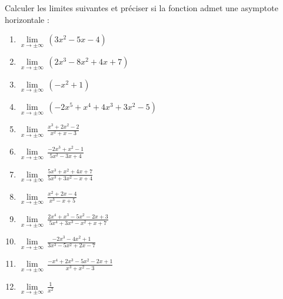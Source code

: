 \begin{exercice}
Calculer les limites suivantes et préciser si la fonction admet une asymptote horizontale :
\begin{multicols}{2}
\begin{enumerate}
\item $\underset{x\to \pm \infty }{\mathop{\lim }}\,\left( 3{{x}^{2}}-5x-4 \right)$
\item $\underset{x\to \pm \infty }{\mathop{\lim }}\,\left( 2{{x}^{3}}-8{{x}^{2}}+4x+7 \right)$
\item $\underset{x\to \pm \infty }{\mathop{\lim }}\,\left( -{{x}^{2}}+1 \right)$
\item $\underset{x\to \pm \infty }{\mathop{\lim }}\,\left( -2{{x}^{5}}+{{x}^{4}}+4{{x}^{3}}+3{{x}^{2}}-5 \right)$
\item $\underset{x\to \pm \infty }{\mathop{\lim }}\,\frac{{{x}^{3}}+2{{x}^{2}}-2}{{{x}^{2}}+x-3}$
\item $\underset{x\to \pm \infty }{\mathop{\lim }}\,\frac{-2{{x}^{3}}+{{x}^{2}}-1}{5{{x}^{2}}-3x+4}$
\item $\underset{x\to \pm \infty }{\mathop{\lim }}\,\frac{5{{x}^{3}}+{{x}^{2}}+4x+7}{5{{x}^{3}}+3{{x}^{2}}-x+4}$
\item $\underset{x\to \pm \infty }{\mathop{\lim }}\,\frac{{{x}^{2}}+2x-4}{{{x}^{3}}-x+5}$
\item $\underset{x\to \pm \infty }{\mathop{\lim }}\,\frac{2{{x}^{4}}+{{x}^{3}}-5{{x}^{2}}-2x+3}{5{{x}^{4}}+3{{x}^{3}}-{{x}^{2}}+x+7}$
\item $\underset{x\to \pm \infty }{\mathop{\lim }}\,\frac{-2{{x}^{3}}-4{{x}^{2}}+1}{3{{x}^{3}}-5{{x}^{2}}+2x-7}$
\item $\underset{x\to \pm \infty }{\mathop{\lim }}\,\frac{-{{x}^{4}}+2{{x}^{3}}-5{{x}^{2}}-2x+1}{{{x}^{3}}+{{x}^{2}}-3}$
\item $\underset{x\to \pm \infty }{\mathop{\lim }}\,\frac{1}{{{x}^{2}}}$
\end{enumerate}
\end{multicols}
\end{exercice}